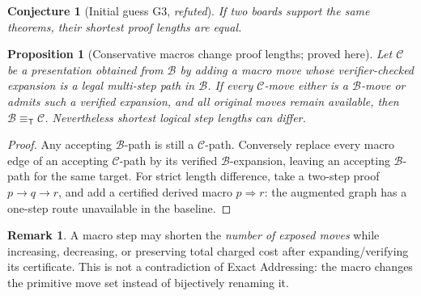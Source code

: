 \documentclass[11pt,letterpaper]{article}
\newtheorem{proposition}[theorem]{Proposition}
\newtheorem{conjecture}[theorem]{Conjecture}
\theoremstyle{definition}
\newtheorem{remark}[theorem]{Remark}
\newcommand{\B}{\mathcal B}
\newcommand{\T}{\mathsf T}
\newcommand{\eqT}{\equiv_{\T}}
\begin{document}
\begin{center}
\end{center}

\begin{conjecture}[Initial guess G3, \emph{refuted}]
If two boards support the same theorems, their shortest proof lengths are equal.
\end{conjecture}
\begin{proposition}[Conservative macros change proof lengths; proved here]\label{prop:macro}
Let $\mathcal C$ be a presentation obtained from $\B$ by adding a macro move whose verifier-checked expansion is a legal multi-step path in $\B$. If every $\mathcal C$-move either is a $\B$-move or admits such a verified expansion, and all original moves remain available, then $\B\eqT\mathcal C$. Nevertheless shortest \emph{logical step} lengths can differ.
\end{proposition}
\begin{proof}
Any accepting $\B$-path is still a $\mathcal C$-path. Conversely replace every macro edge of an accepting $\mathcal C$-path by its verified $\B$-expansion, leaving an accepting $\B$-path for the same target. For strict length difference, take a two-step proof $p\to q\to r$, and add a certified derived macro $p\Rightarrow r$: the augmented graph has a one-step route unavailable in the baseline.
\end{proof}
\begin{remark}
A macro step may shorten the \emph{number of exposed moves} while increasing, decreasing, or preserving total charged cost after expanding/verifying its certificate. This is not a contradiction of Exact Addressing: the macro changes the primitive move set instead of bijectively renaming it.
\end{remark}
\end{document}
